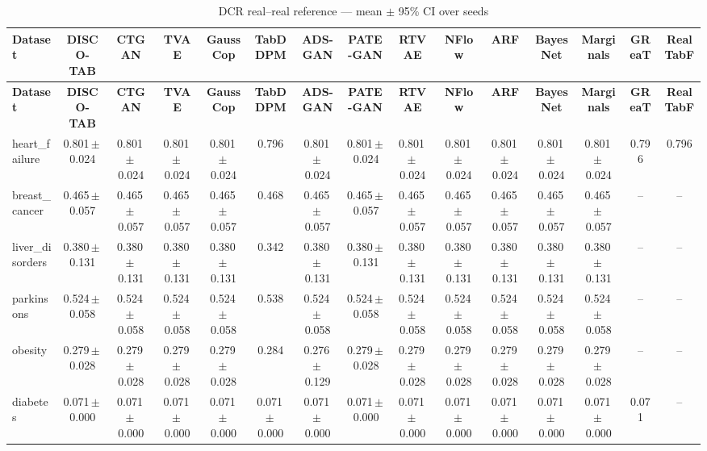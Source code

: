 \documentclass[8pt]{extarticle}
\begin{document}
\begin{longtable}{l*{14}{c}}
\caption{DCR real--real reference --- mean $\pm$ 95\% CI over seeds}\\
\toprule
\textbf{Dataset} & \textbf{DISCO-TAB} & \textbf{CTGAN} & \textbf{TVAE} & \textbf{GaussCop} & \textbf{TabDDPM} & \textbf{ADS-GAN} & \textbf{PATE-GAN} & \textbf{RTVAE} & \textbf{NFlow} & \textbf{ARF} & \textbf{BayesNet} & \textbf{Marginals} & \textbf{GReaT} & \textbf{RealTabF} \\
\midrule
\endfirsthead
\toprule
\textbf{Dataset} & \textbf{DISCO-TAB} & \textbf{CTGAN} & \textbf{TVAE} & \textbf{GaussCop} & \textbf{TabDDPM} & \textbf{ADS-GAN} & \textbf{PATE-GAN} & \textbf{RTVAE} & \textbf{NFlow} & \textbf{ARF} & \textbf{BayesNet} & \textbf{Marginals} & \textbf{GReaT} & \textbf{RealTabF} \\
\midrule
\endhead
\bottomrule
\endfoot
heart\_failure & 0.801\,$\pm$\,0.024 & 0.801\,$\pm$\,0.024 & 0.801\,$\pm$\,0.024 & 0.801\,$\pm$\,0.024 & 0.796 & 0.801\,$\pm$\,0.024 & 0.801\,$\pm$\,0.024 & 0.801\,$\pm$\,0.024 & 0.801\,$\pm$\,0.024 & 0.801\,$\pm$\,0.024 & 0.801\,$\pm$\,0.024 & 0.801\,$\pm$\,0.024 & 0.796 & 0.796 \\
breast\_cancer & 0.465\,$\pm$\,0.057 & 0.465\,$\pm$\,0.057 & 0.465\,$\pm$\,0.057 & 0.465\,$\pm$\,0.057 & 0.468 & 0.465\,$\pm$\,0.057 & 0.465\,$\pm$\,0.057 & 0.465\,$\pm$\,0.057 & 0.465\,$\pm$\,0.057 & 0.465\,$\pm$\,0.057 & 0.465\,$\pm$\,0.057 & 0.465\,$\pm$\,0.057 & -- & -- \\
liver\_disorders & 0.380\,$\pm$\,0.131 & 0.380\,$\pm$\,0.131 & 0.380\,$\pm$\,0.131 & 0.380\,$\pm$\,0.131 & 0.342 & 0.380\,$\pm$\,0.131 & 0.380\,$\pm$\,0.131 & 0.380\,$\pm$\,0.131 & 0.380\,$\pm$\,0.131 & 0.380\,$\pm$\,0.131 & 0.380\,$\pm$\,0.131 & 0.380\,$\pm$\,0.131 & -- & -- \\
parkinsons & 0.524\,$\pm$\,0.058 & 0.524\,$\pm$\,0.058 & 0.524\,$\pm$\,0.058 & 0.524\,$\pm$\,0.058 & 0.538 & 0.524\,$\pm$\,0.058 & 0.524\,$\pm$\,0.058 & 0.524\,$\pm$\,0.058 & 0.524\,$\pm$\,0.058 & 0.524\,$\pm$\,0.058 & 0.524\,$\pm$\,0.058 & 0.524\,$\pm$\,0.058 & -- & -- \\
obesity & 0.279\,$\pm$\,0.028 & 0.279\,$\pm$\,0.028 & 0.279\,$\pm$\,0.028 & 0.279\,$\pm$\,0.028 & 0.284 & 0.276\,$\pm$\,0.129 & 0.279\,$\pm$\,0.028 & 0.279\,$\pm$\,0.028 & 0.279\,$\pm$\,0.028 & 0.279\,$\pm$\,0.028 & 0.279\,$\pm$\,0.028 & 0.279\,$\pm$\,0.028 & -- & -- \\
diabetes & 0.071\,$\pm$\,0.000 & 0.071\,$\pm$\,0.000 & 0.071\,$\pm$\,0.000 & 0.071\,$\pm$\,0.000 & 0.071\,$\pm$\,0.000 & 0.071\,$\pm$\,0.000 & 0.071\,$\pm$\,0.000 & 0.071\,$\pm$\,0.000 & 0.071\,$\pm$\,0.000 & 0.071\,$\pm$\,0.000 & 0.071\,$\pm$\,0.000 & 0.071\,$\pm$\,0.000 & 0.071 & -- \\

\end{longtable}
\end{document}

